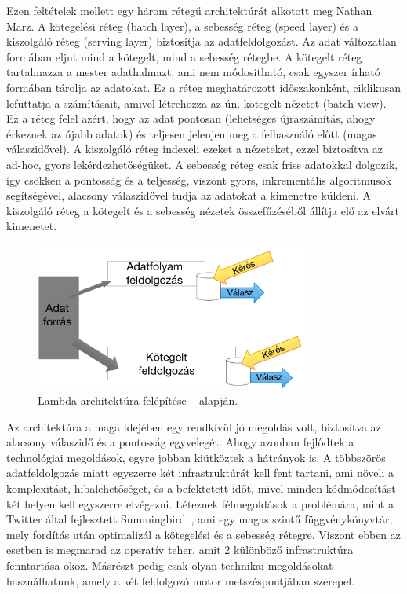 \documentclass[a4paper,12pt]{article}
\begin{document}
Ezen feltételek mellett egy három rétegű architektúrát alkotott meg Nathan Marz\cite{lambda}. A kötegelési réteg (batch layer), a sebesség réteg (speed layer) és a kiszolgáló réteg (serving layer) biztosítja az adatfeldolgozást. Az adat változatlan formában eljut mind a kötegelt, mind a sebesség rétegbe. A kötegelt réteg tartalmazza a mester adathalmazt, ami nem módosítható, csak egyszer írható formában tárolja az adatokat. Ez a réteg meghatározott időszakonként, ciklikusan lefuttatja a számításait, amivel létrehozza az ún. kötegelt nézetet (batch view). Ez a réteg felel azért, hogy az adat pontosan (lehetséges újraszámítás, ahogy érkeznek az újabb adatok) és teljesen jelenjen meg a felhasználó előtt (magas válaszidővel).  A kiszolgáló réteg indexeli ezeket a nézeteket, ezzel biztosítva az ad-hoc, gyors lekérdezhetőségüket. \newline
A sebesség réteg csak friss adatokkal dolgozik, így csökken a pontosság és a teljesség, viszont gyors, inkrementális algoritmusok segítségével, alacsony válaszidővel tudja az adatokat a kimenetre küldeni. A kiszolgáló réteg a kötegelt és a sebesség nézetek összefűzéséből állítja elő az elvárt kimenetet.

\begin{figure}[ht!]
\centering
\includegraphics[width=90mm]{img/lambda.png}
\caption{Lambda architektúra felépítése ~\cite{lambdaarch} alapján. \label{lambda}}
\end{figure}

Az architektúra a maga idejében egy rendkívül jó megoldás volt, biztosítva az alacsony válaszidő és a pontosság egyvelegét. Ahogy azonban fejlődtek a technológiai megoldások, egyre jobban kiütköztek a hátrányok is. A többszörös adatfeldolgozás miatt egyszerre két infrastruktúrát kell fent tartani, ami növeli a komplexitást, hibalehetőséget, és a befektetett időt, mivel minden kódmódosítást két helyen kell egyszerre elvégezni. Léteznek félmegoldások a problémára, mint a Twitter által fejlesztett Summingbird~\cite{summingbird}, ami egy magas szintű függvénykönyvtár, mely fordítás után optimalizál a kötegelési és a sebesség rétegre. Viszont ebben az esetben is megmarad az operatív teher, amit 2 különböző infrastruktúra fenntartása okoz. Másrészt pedig csak olyan technikai megoldásokat használhatunk, amely a két feldolgozó motor metszéspontjában szerepel. \newline
\end{document}
